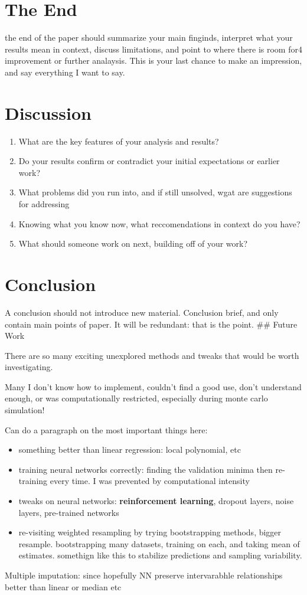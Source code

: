 \documentclass[12pt,twoside]{reedthesis}
\providecommand{\tightlist}{%
  \setlength{\itemsep}{0pt}\setlength{\parskip}{0pt}}
\begin{document}
\section{The End}\label{the-end}

the end of the paper should summarize your main finginds, interpret what
your results mean in context, discuss limitations, and point to where
there is room for4 improvement or further analaysis. This is your last
chance to make an impression, and say everything I want to say.

\section{Discussion}\label{discussion}
\begin{enumerate}
\def\labelenumi{\arabic{enumi}.}
\tightlist
\item
  What are the key features of your analysis and results?
\item
  Do your results confirm or contradict your initial expectations or
  earlier work?
\item
  What problems did you run into, and if still unsolved, wgat are
  suggestions for addressing
\item
  Knowing what you know now, what reccomendations in context do you
  have?
\item
  What should someone work on next, building off of your work?
\end{enumerate}
\section{Conclusion}\label{conclusion-1}

A conclusion should not introduce new material. Conclusion brief, and
only contain main points of paper. It will be redundant: that is the
point. \#\# Future Work

There are so many exciting unexplored methods and tweaks that would be
worth investigating.

Many I don't know how to implement, couldn't find a good use, don't
understand enough, or was computationally restricted, especially during
monte carlo simulation!

Can do a paragraph on the most important things here:
\begin{itemize}
\tightlist
\item
  something better than linear regression: local polynomial, etc
\item
  training neural networks correctly: finding the validation minima then
  re-training every time. I was prevented by computational intensity
\item
  tweaks on neural networks: \textbf{reinforcement learning}, dropout
  layers, noise layers, pre-trained networks
\item
  re-visiting weighted resampling by trying bootstrapping methods,
  bigger resample. bootstrapping many datasets, training on each, and
  taking mean of estimates. somethign like this to stabilize predictions
  and sampling variability.
\end{itemize}
Multiple imputation: since hopefully NN preserve intervarabhle
relationships better than linear or median etc
\end{document}
